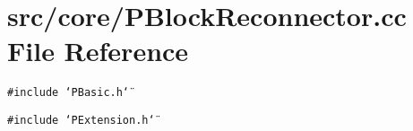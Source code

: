 \section{src/core/PBlock\-Reconnector.cc File Reference}
\label{PBlockReconnector_8cc}


{\tt \#include \char`\"{}PBasic.h\char`\"{}}\par
{\tt \#include \char`\"{}PExtension.h\char`\"{}}\par
